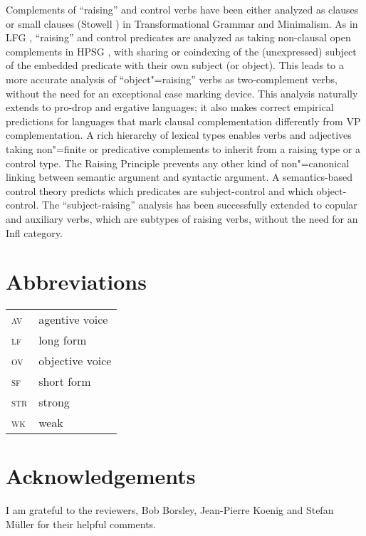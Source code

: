 Complements of ``raising'' and control verbs have been either analyzed as clauses \citep[55--63]{Chomsky81a}
or small clauses (Stowell \citeyear{Stowell81a-u,Stowell1983})
in Transformational Grammar and Minimalism.  As in LFG
\citep{Bresnan1982}, ``raising'' and control predicates are analyzed as taking non-clausal open
complements in HPSG \citep[Chapter~3]{PollardandSag1994}, with sharing or coindexing of the (unexpressed) subject
of the embedded predicate with their own subject (or object). This leads to a more accurate analysis
of ``object"=raising'' verbs as two-complement verbs, without the need for an exceptional case marking
device. This analysis naturally extends to pro-drop and ergative languages; it also makes correct
empirical predictions for languages that mark clausal complementation differently from VP
complementation. A rich hierarchy of lexical types enables verbs and adjectives taking non"=finite
or predicative complements to inherit from a raising type or a control type. The Raising Principle
prevents any other kind of non"=canonical linking between semantic argument and syntactic
argument. A semantics-based control theory predicts which predicates are subject-control and which
object-control. The ``subject-raising'' analysis has been successfully extended to copular and
auxiliary verbs, which are subtypes of raising verbs, without the need for an Infl category.



\section*{Abbreviations}

\begin{tabularx}{.45\textwidth}{@{}lX}
\textsc{av} & agentive voice\\
\textsc{lf} & long form\\ 
\textsc{ov} & objective voice\\
\textsc{sf} & short form\\
\textsc{str} & strong\\
\textsc{wk} & weak\\

\end{tabularx}

\section*{Acknowledgements}

I am grateful to the reviewers, Bob Borsley, Jean-Pierre Koenig and Stefan Müller for their helpful comments.
{\sloppy
\printbibliography[heading=subbibliography,notkeyword=this] 
}




